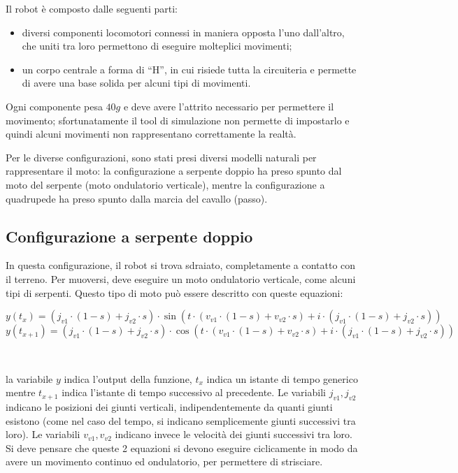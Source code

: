 \documentclass[a4paper,titlepage]{book}
\begin{document}
Il robot è composto dalle seguenti parti:
\begin{itemize}
  \item diversi componenti locomotori connessi in maniera opposta l'uno dall'altro, che uniti tra loro permettono di eseguire molteplici movimenti;
  \item un corpo centrale a forma di ``H'', in cui risiede tutta la circuiteria e permette di avere una base solida per alcuni tipi di movimenti.
\end{itemize}

Ogni componente pesa $40g$ e deve avere l'attrito necessario per permettere il movimento; sfortunatamente il tool di simulazione non permette di impostarlo e quindi alcuni movimenti non rappresentano correttamente la realtà.

Per le diverse configurazioni, sono stati presi diversi modelli naturali per rappresentare il moto: la configurazione a serpente doppio ha preso spunto dal moto del serpente (moto ondulatorio verticale), mentre la configurazione a quadrupede ha preso spunto dalla marcia del cavallo (passo).

\subsection{Configurazione a serpente doppio}

In questa configurazione, il robot si trova sdraiato, completamente a contatto con il terreno. Per muoversi, deve eseguire un moto ondulatorio verticale, come alcuni tipi di serpenti. Questo tipo di moto può essere descritto con queste equazioni:

$$ y(t_{x}) = (j_{v1} \cdot (1-s)+j_{v2} \cdot s) \cdot \sin(t \cdot (v_{v1} \cdot (1-s)+v_{v2} \cdot s)+i \cdot (j_{v1} \cdot (1-s)+j_{v2} \cdot s)) $$
$$ y(t_{x+1}) = (j_{v1} \cdot (1-s)+j_{v2} \cdot s) \cdot \cos(t \cdot (v_{v1} \cdot (1-s)+v_{v2} \cdot s)+i \cdot (j_{v1} \cdot (1-s)+j_{v2} \cdot s)) $$

~

la variabile $ y $ indica l'output della funzione, $ t_{x} $ indica un istante di tempo generico mentre $ t_{x+1} $ indica l'istante di tempo successivo al precedente. Le variabili $ j_{v1}, j_{v2} $ indicano le posizioni dei giunti verticali, indipendentemente da quanti giunti esistono (come nel caso del tempo, si indicano semplicemente giunti successivi tra loro).  Le variabili $ v_{v1}, v_{v2} $ indicano invece le velocità dei giunti successivi tra loro.
Si deve pensare che queste 2 equazioni si devono eseguire ciclicamente in modo da avere un movimento continuo ed ondulatorio, per permettere di strisciare.
\end{document}
